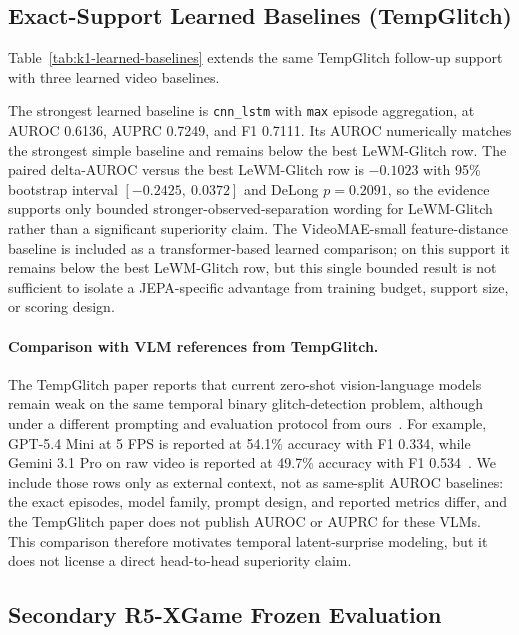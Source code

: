 

\subsection{Exact-Support Learned Baselines (TempGlitch)}

Table~\ref{tab:k1-learned-baselines} extends the same TempGlitch follow-up support with three
learned video baselines.



The strongest learned baseline is \texttt{cnn\_lstm} with \texttt{max} episode aggregation, at
AUROC 0.6136, AUPRC 0.7249, and F1 0.7111. Its AUROC numerically matches the strongest simple
baseline and remains below the best LeWM-Glitch row. The paired delta-AUROC versus the best
LeWM-Glitch row is $-0.1023$ with 95\% bootstrap interval $[-0.2425,\ 0.0372]$ and
DeLong $p=0.2091$, so the evidence supports only bounded stronger-observed-separation wording
for LeWM-Glitch rather than a significant superiority claim.
The VideoMAE-small feature-distance baseline is included as a transformer-based learned
comparison; on this support it remains below the best LeWM-Glitch row, but this single bounded
result is not sufficient to isolate a JEPA-specific advantage from training budget, support size,
or scoring design.

\paragraph{Comparison with VLM references from TempGlitch.}
The TempGlitch paper reports that current zero-shot vision-language models remain weak on the
same temporal binary glitch-detection problem, although under a different prompting and evaluation
protocol from ours~\cite{tempglitch}. For example, GPT-5.4 Mini at 5 FPS is reported at
54.1\% accuracy with F1 0.334, while Gemini 3.1 Pro on raw video is reported at 49.7\%
accuracy with F1 0.534~\cite{tempglitch}. We include those rows only as external context, not as
same-split AUROC baselines: the exact episodes, model family, prompt design, and reported metrics
differ, and the TempGlitch paper does not publish AUROC or AUPRC for these VLMs. This comparison
therefore motivates temporal latent-surprise modeling, but it does not license a direct
head-to-head superiority claim.

\subsection{Secondary R5-XGame Frozen Evaluation}


